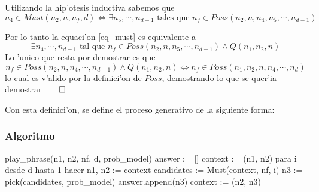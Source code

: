 Utilizando la hip'otesis inductiva sabemos que 
$$  n_4 \in Must(n_2, n, n_f, d) \Leftrightarrow \exists n_5, \cdots, n_{d-1} \text{ tales que } n_f \in Poss(n_2, n, n_4, n_5, \cdots, n_{d-1})$$

Por lo tanto la equaci'on \ref{eq_must} es equivalente a
$$ \exists n_4, \cdots, n_{d-1} \text{ tal que } n_f \in Poss(n_2, n, n_5, \cdots, n_{d-1}) \land Q(n_1,n_2, n) $$
Lo 'unico que resta por demostrar es que 
$$ n_f \in Poss(n_2, n, n_4, \cdots, n_{d-1}) \land Q(n_1,n_2, n) \Leftrightarrow n_f \in Poss(n_1, n_2, n, n_4, \cdots, n_d)$$
lo cual es v'alido por la definici'on de $Poss$, demostrando lo que se quer'ia demostrar$\qed$



 Con esta definici'on, se define el proceso generativo de 
la siguiente forma:

\subsubsection{Algoritmo}

\begin{algoritmo}
play_phrase(n1, n2, nf, d, prob_model)
    answer := []
    context := (n1, n2)
    para i desde d hasta 1 hacer
        n1, n2 := context
        candidates := Must(context, nf, i)
        n3 := pick(candidates, prob_model)
        answer.append(n3)
        context := (n2, n3) 

\end{algoritmo}




